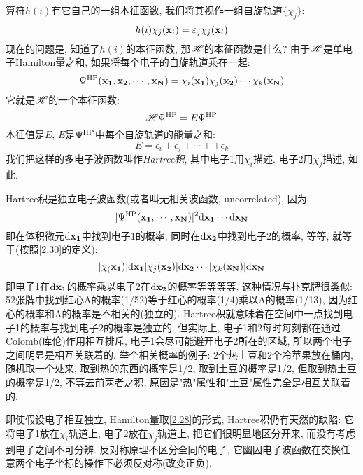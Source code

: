 算符$h(i)$有它自己的一组本征函数, 我们将其视作一组自旋轨道$\{\chi_j\}$:
\begin{equation}
\label{2.29}
h(i)\chi_j(\mathbf{x}_i)=\varepsilon_j\chi_j(\mathbf{x}_i)
\end{equation}
现在的问题是, 知道了$h(i)$的本征函数, 那$\mathscr{H}$的本征函数是什么? 由于$\mathscr{H}$是单电子Hamilton量之和, 如果将每个电子的自旋轨道乘在一起:
\begin{equation}
\label{2.30}
\Psi^{\rm HP}(\mathbf{x_1,x_2,\cdots,x_N})=\chi_i(\mathbf{x_1})\chi_j(\mathbf{x_2})\cdots\chi_k(\mathbf{x_N})
\end{equation}
它就是$\mathscr{H}$的一个本征函数:
\begin{equation}
\label{2.31}
\mathscr{H}\Psi^{\rm HP}=E\Psi^{\rm HP}
\end{equation}
本征值是$E$, $E$是$\Psi^{\rm HP}$中每个自旋轨道的能量之和:
\begin{equation}
\label{2.32}
E=\epsilon_i + \epsilon_j + \cdots + +\epsilon_k
\end{equation} 
我们把这样的多电子波函数叫作\emph{Hartree积}, 其中电子1用$\chi_i$描述. 电子2用$\chi_j$描述, 如此.


Hartree积是独立电子波函数(或者叫无相关波函数, uncorrelated), 因为
\begin{equation*}
|\Psi^{\rm HP}(\bo{x_1,\cdots,x_N})|^2\dd\bo{x_1}\cdots\dd\bo{x_N}
\end{equation*}
即在体积微元$\dd\bo{x_1}$中找到电子1的概率, 同时在$\dd\bo{x_2}$中找到电子2的概率, 等等, 就等于(按照\ref{2.30}的定义):
\begin{equation*}
|\chi_(\bo{x_1})|\dd\bo{x_1}|\chi_j(\bo{x_2})|\dd\bo{x_2}\cdots|\chi_k(\bo{x_N})|\dd\bo{x_N}
\end{equation*}
即电子1在$\dd\bo{x_1}$的概率乘以电子2在$\dd\bo{x_2}$的概率等等等等. 这种情况与扑克牌很类似: 52张牌中找到红心A的概率(1/52)等于红心的概率(1/4)乘以A的概率(1/13), 因为红心的概率和A的概率是不相关的(独立的). Hartree积就意味着在空间中一点找到电子1的概率与找到电子2的概率是独立的. 但实际上, 电子1和2每时每刻都在通过Colomb(库伦)作用相互排斥, 电子1会尽可能避开电子2所在的区域, 所以两个电子之间明显是相互关联着的. 举个相关概率的例子: 2个热土豆和2个冷苹果放在桶内, 随机取一个处来, 取到热的东西的概率是1/2, 取到土豆的概率是1/2, 但取到热土豆的概率是1/2, 不等去前两者之积, 原因是"热"属性和"土豆"属性完全是相互关联着的.

即使假设电子相互独立, Hamilton量取\ref{2.28}的形式, Hartree积仍有天然的缺陷: 它将电子1放在$\chi_i$轨道上, 电子2放在$\chi_j$轨道上, 把它们很明显地区分开来, 而没有考虑到电子之间不可分辨. 反对称原理不区分全同的电子, 它幽囚电子波函数在交换任意两个电子坐标的操作下必须反对称(改变正负).
